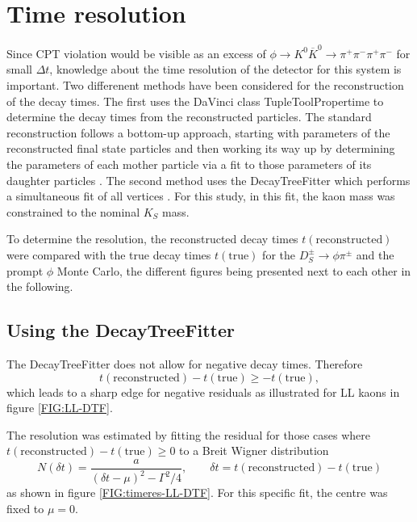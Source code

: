 \section{Time resolution}
Since CPT violation would be visible as an excess of $\phi \rightarrow K^0 \overline{K}^0 \rightarrow \pi^+ \pi^- \pi^+ \pi^-$ for small $\Delta t$, knowledge about the time resolution of the detector for this system is important.
Two differenent methods have been considered for the reconstruction of the decay times. 
The first uses the DaVinci class TupleToolPropertime %
to determine the decay times from the reconstructed particles. The standard reconstruction follows a bottom-up approach, starting with parameters of the reconstructed final state particles and then working its way up by determining the parameters of each mother particle via a fit to those parameters of its daughter particles \cite{2005NIMPA.552..566H}.
The second method uses the DecayTreeFitter %
which performs a simultaneous fit of all vertices \cite{2005NIMPA.552..566H}. For this study, in this fit, the kaon mass was constrained to the nominal $K_S$ mass.


To determine the resolution, the reconstructed decay times $t(\text{reconstructed})$ were compared with the true decay times $t(\text{true})$ for the $D_S^\pm \rightarrow \phi \pi^\pm$ and the prompt $\phi$ Monte Carlo, the different figures being presented next to each other in the following.


\subsection{Using the DecayTreeFitter}
The DecayTreeFitter does not allow for negative decay times. Therefore 
\begin{equation}
t(\text{reconstructed})-t(\text{true})\geq - t(\text{true}),
\end{equation}
which leads to a sharp edge for negative residuals as illustrated for LL kaons in figure \ref{FIG:LL-DTF}. 

The resolution was estimated by fitting the residual for those cases where $t(\text{reconstructed})-t(\text{true}) \geq 0$ to a Breit Wigner distribution
\begin{equation}
N(\delta t) = \frac{a}{(\delta t- \mu)^2 - \Gamma^2/4}, \qquad \delta t = t(\text{reconstructed})-t(\text{true}) \label{EQ:BWt}
\end{equation}
as shown in figure \ref{FIG:timeres-LL-DTF}. For this specific fit, the centre was fixed to $\mu =0$.


